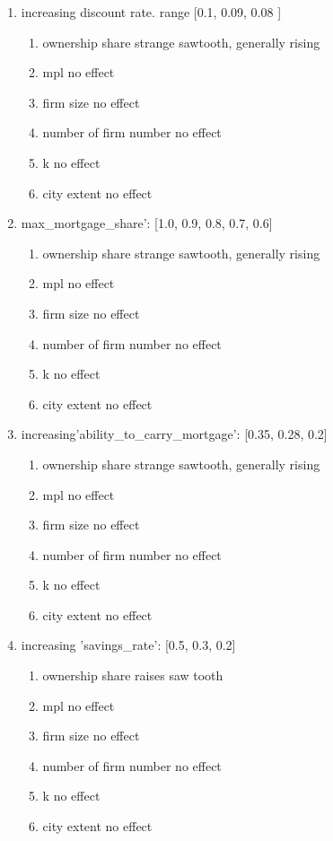 \begin{itemize}
\begin{enumerate}
     \item increasing discount rate.  range [0.1, 0.09, 0.08 ]
    \begin{enumerate}
        \item ownership share  strange sawtooth, generally rising
        \item mpl     no effect              
        \item firm size       no effect         
        \item number of firm number no effect 
        \item k           no effect           
        \item city extent    no effect           
    \end{enumerate}

    
    \item max\_mortgage\_share': [1.0, 0.9, 0.8, 0.7, 0.6]
    \begin{enumerate}
         \item ownership share  strange sawtooth, generally rising
        \item mpl     no effect              
        \item firm size       no effect         
        \item number of firm number no effect 
        \item k           no effect           
        \item city extent    no effect               
    \end{enumerate}


 \item increasing'ability\_to\_carry\_mortgage': [0.35, 0.28, 0.2]
   \begin{enumerate}
         \item ownership share  strange sawtooth, generally rising
        \item mpl     no effect              
        \item firm size       no effect         
        \item number of firm number no effect 
        \item k           no effect           
        \item city extent    no effect  
     \end{enumerate}


      \item increasing 'savings\_rate': [0.5, 0.3, 0.2]
   \begin{enumerate}
         \item ownership share  raises saw tooth
        \item mpl                   no effect
        \item firm size             no effect         
        \item number of firm number no effect 
        \item k                     no effect           
        \item city extent           no effect  
     \end{enumerate}


\end{enumerate}
\end{itemize}
